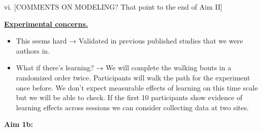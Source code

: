 vi. [COMMENTS ON MODELING? That point to the end of Aim II]

\noindent \underline{\textbf{Experimental concerns.}}

\begin{itemize}
\item
  This seems hard → Validated in previous published studies that we were
  authors in.
\item
  What if there's learning? → We will complete the walking bouts in a
  randomized order twice. Participants will walk the path for the
  experiment once before. We don't expect measurable effects of learning
  on this time scale but we will be able to check. If the first 10
  participants show evidence of learning effects across sessions we can
  consider collecting data at two sites.
\end{itemize}


\textbf{Aim 1b: }
